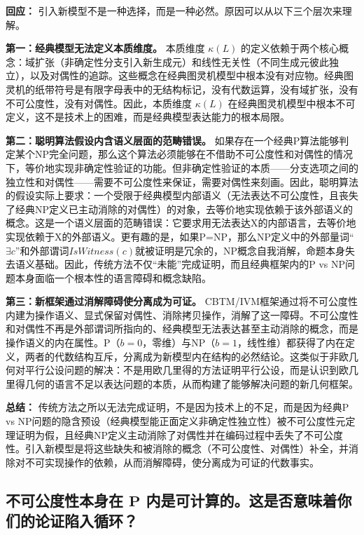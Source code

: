 \documentclass{ctexart}
\begin{document}
	\textbf{回应：} 引入新模型不是一种选择，而是一种必然。原因可以从以下三个层次来理解。
	
	\textbf{第一：经典模型无法定义本质维度。} 本质维度 $\kappa(L)$ 的定义依赖于两个核心概念：域扩张（非确定性分支引入新生成元）和线性无关性（不同生成元彼此独立），以及对偶性的追踪。这些概念在经典图灵机模型中根本没有对应物。经典图灵机的纸带符号是有限字母表中的无结构标记，没有代数运算，没有域扩张，没有不可公度性，没有对偶性。因此，本质维度 $\kappa(L)$ 在经典图灵机模型中根本不可定义，这不是技术上的困难，而是经典模型表达能力的根本局限。
	
	\textbf{第二：聪明算法假设内含语义层面的范畴错误。} 如果存在一个经典P算法能够判定某个NP完全问题，那么这个算法必须能够在不借助不可公度性和对偶性的情况下，等价地实现非确定性验证的功能。但非确定性验证的本质——分支选项之间的独立性和对偶性——需要不可公度性来保证，需要对偶性来刻画。因此，聪明算法的假设实际上要求：一个受限于经典模型内部语义（无法表达不可公度性，且丧失了经典NP定义已主动消除的对偶性）的对象，去等价地实现依赖于该外部语义的概念。这是一个语义层面的范畴错误：它要求用无法表达X的内部语言，去等价地实现依赖于X的外部语义。更有趣的是，如果P=NP，那么NP定义中的外部量词``$\exists c$''和外部谓词$IsWitness(c)$就被证明是冗余的，NP概念自我消解，命题本身失去语义基础。因此，传统方法不仅``未能''完成证明，而且经典框架内的P vs NP问题本身面临一个根本性的语言障碍和概念缺陷。
	
	\textbf{第三：新框架通过消解障碍使分离成为可证。} CBTM/IVM框架通过将不可公度性内建为操作语义、显式保留对偶性、消除拷贝操作，消解了这一障碍。不可公度性和对偶性不再是外部谓词所指向的、经典模型无法表达甚至主动消除的概念，而是操作语义的内在属性。P（$b=0$，零维）与NP（$b=1$，线性维）都获得了内在定义，两者的代数结构互斥，分离成为新模型内在结构的必然结论。这类似于非欧几何对平行公设问题的解决：不是用欧几里得的方法证明平行公设，而是认识到欧几里得几何的语言不足以表达问题的本质，从而构建了能够解决问题的新几何框架。
	
	\textbf{总结：} 传统方法之所以无法完成证明，不是因为技术上的不足，而是因为经典P vs NP问题的隐含预设（经典模型能正面定义非确定性独立性）被不可公度性元定理证明为假，且经典NP定义主动消除了对偶性并在编码过程中丢失了不可公度性。引入新模型是将这些缺失和被消除的概念（不可公度性、对偶性）补全，并消除对不可实现操作的依赖，从而消解障碍，使分离成为可证的代数事实。
	
	
	
	\subsection{不可公度性本身在 $\mathbf{P}$ 内是可计算的。这是否意味着你们的论证陷入循环？}
	
\end{document}
